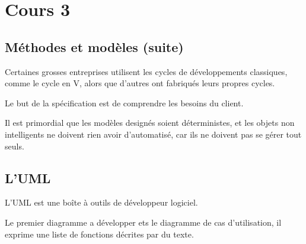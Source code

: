 \section{Cours 3}
\subsection{Méthodes et modèles (suite)}
Certaines grosses entreprises utilisent les cycles de développements classiques, comme le cycle en V, alors que d'autres ont fabriqués leurs propres cycles.

Le but de la spécification est de comprendre les besoins du client.

Il est primordial que les modèles designés soient déterministes, et les objets non intelligents ne doivent rien avoir d'automatisé, car ils ne doivent pas se gérer tout seuls.

\subsection{L'UML}
L'UML est une boîte à outils de développeur logiciel.

Le premier diagramme a développer ets le diagramme de cas d'utilisation, il exprime une liste de fonctions décrites par du texte.
